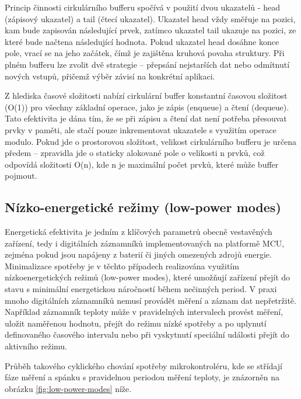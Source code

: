 \newpage

Princip činnosti cirkulárního bufferu spočívá v použití dvou ukazatelů - head (zápisový ukazatel) a tail (čtecí ukazatel). Ukazatel head vždy směřuje na pozici, kam bude zapisován následující 
prvek, zatímco ukazatel tail ukazuje na pozici, ze které bude načtena následující hodnota. Pokud ukazatel head dosáhne konce pole, vrací se na jeho začátek, čímž je zajištěna kruhová povaha 
struktury. Při plném bufferu lze zvolit dvě strategie – přepsání nejstarších dat nebo odmítnutí nových vstupů, přičemž výběr závisí na konkrétní 
aplikaci.\cite{embedjournal_ring_buffer, medium_ring_buffer}

Z hlediska časové složitosti nabízí cirkulární buffer konstantní časovou složitost (O(1)) pro všechny základní operace, jako je zápis (enqueue) a  čtení (dequeue). Tato efektivita je 
dána tím, že se při zápisu a čtení dat není potřeba přesouvat prvky v paměti, ale stačí pouze inkrementovat ukazatele s využitím operace modulo. Pokud jde o prostorovou složitost, 
velikost cirkulárního bufferu je určena předem – zpravidla jde o staticky alokované pole o velikosti n prvků, což odpovídá složitosti O(n), kde n je maximální počet prvků, které může 
buffer pojmout. \cite{petrungaro_ring_buffer_complexity}

\subsection{Nízko-energetické režimy (low-power modes)}
Energetická efektivita je jedním z klíčových parametrů obecně vestavěných zařízení, tedy i digitálních záznamníků implementovaných na platformě MCU, zejména pokud jsou napájeny z 
baterií či jiných omezených zdrojů energie. Minimalizace spotřeby je v těchto případech realizována využitím nízkoenergetických režimů (low-power modes), které umožňují zařízení přejít 
do stavu s minimální energetickou náročností během nečinných period. V praxi mnoho digitálních záznamníků nemusí provádět měření a záznam dat nepřetržitě. Například záznamník teploty může 
v pravidelných intervalech provést měření, uložit naměřenou hodnotu, přejít do režimu nízké spotřeby a po uplynutí definovaného časového intervalu nebo při vyskytnutí speciální události 
přejít do aktivního režimu. \cite{analog_devices_low_power_modes}

Průběh takového cyklického chování spotřeby mikrokontroléru, kde se střídají fáze měření a spánku s pravidelnou periodou měření teploty, je znázorněn na obrázku \ref{fig:low-power-modes} níže.

